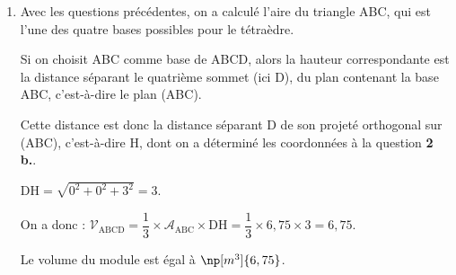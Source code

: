 \begin{enumerate}
\begin{enumerate}
\begin{itemize}
				Or, une équation cartésienne du plan (ABC) étant $z=0$, un vecteur normal au plan (ABC) est  $\vect{m}\begin{pmatrix} 0\\0\\1 \end{pmatrix}$
				
				Les vecteurs $\vect{m}$ et $\vectt{HD}$ sont colinéaires, donc la droite (HD) est orthogonale au plan (ABC).
				
			\end{itemize} 
		
		
		Donc le point H$\left(\dfrac{3}{2} ; 1 ; 0\right)$ est le projeté orthogonal du point D sur le plan (ABC).
	\end{enumerate}
	\item  Avec les questions précédentes, on a calculé l'aire du triangle ABC, qui est l'une des quatre bases possibles pour le tétraèdre.
	
	Si on choisit ABC comme base de ABCD, alors la hauteur correspondante est la distance séparant le quatrième sommet (ici D), du plan contenant la base ABC, c'est-à-dire le plan (ABC).
	
	Cette distance est donc la distance séparant D de son projeté orthogonal sur (ABC), c'est-à-dire H, dont on a déterminé les coordonnées à la question \textbf{2 b.}.
	
	$\mathrm{DH} = \sqrt{0^2 + 0^2 + 3 ^2 } = 3$.
	
	On a donc : \quad $\mathcal{V}_{\mathrm{ABCD}} = \dfrac{1}{3} \times \mathcal{A}_{\mathrm{ABC}} \times \mathrm{DH} = \dfrac{1}{3} \times 6,75 \times 3 = 6,75$.
	
	Le volume du module est égal  à  $\np[m^3]{6,75}$.

\end{enumerate}


